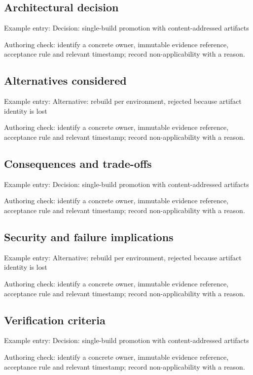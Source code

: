 \documentclass[10pt,letterpaper]{article}
\begin{document}
\subsection{Architectural decision}
Example entry: Decision: single-build promotion with content-addressed artifacts

Authoring check: identify a concrete owner, immutable evidence reference, acceptance rule and relevant timestamp; record non-applicability with a reason.


\subsection{Alternatives considered}
Example entry: Alternative: rebuild per environment, rejected because artifact identity is lost

Authoring check: identify a concrete owner, immutable evidence reference, acceptance rule and relevant timestamp; record non-applicability with a reason.


\subsection{Consequences and trade-offs}
Example entry: Decision: single-build promotion with content-addressed artifacts

Authoring check: identify a concrete owner, immutable evidence reference, acceptance rule and relevant timestamp; record non-applicability with a reason.


\subsection{Security and failure implications}
Example entry: Alternative: rebuild per environment, rejected because artifact identity is lost

Authoring check: identify a concrete owner, immutable evidence reference, acceptance rule and relevant timestamp; record non-applicability with a reason.


\subsection{Verification criteria}
Example entry: Decision: single-build promotion with content-addressed artifacts

Authoring check: identify a concrete owner, immutable evidence reference, acceptance rule and relevant timestamp; record non-applicability with a reason.
\end{document}
